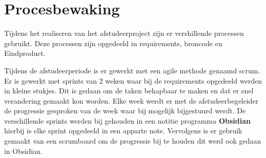 \section{Procesbewaking}
Tijdens het realiseren van het afstudeerproject zijn er vershillende processen gebruikt.
Deze processen zijn opgedeeld in requirements, broncode en Eindproduct. 

Tijdens de afstudeerperiode is er gewerkt met een agile methode genaamd scrum.
Er is gewerkt met sprints van 2 weken waar bij de requirements opgedeeld werden in kleine stukjes.
Dit is gedaan om de taken behapbaar te maken en dat er snel verandering gemaakt kon worden.
Elke week werdt er met de afstudeerbegeleider de progressie gesproken van de week waar bij mogelijk bijgestuurd werdt.
De verschillende sprints werden bij gehouden in een notitie programma \textbf{Obsidian} hierbij is elke sprint opgedeeld in een apparte note.
Vervolgens is er gebruik gemaakt van een scrumboard om de progressie bij te houden dit werd ook gedaan in Obsidian.





